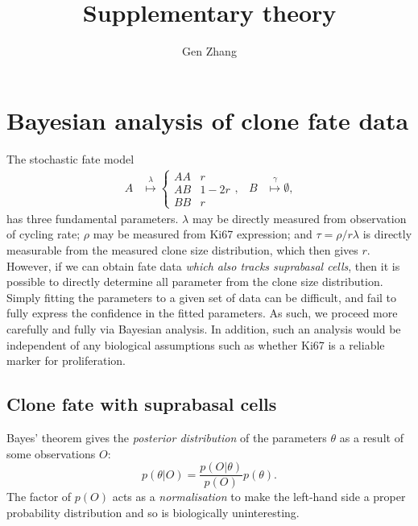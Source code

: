 \documentclass[10pt,UKenglish]{article}
\begin{document}
\title{Supplementary theory}
\author{Gen Zhang}
 
\maketitle

\renewcommand{\thesection}{S\arabic{section}}

\section{Bayesian analysis of clone fate data}

The stochastic fate model 
\begin{align}
A &\overset{\lambda}{\longmapsto} \begin{cases}
AA & r \\
AB & 1-2r \\
BB & r\end{cases}, & B &\overset{\gamma}{\longmapsto} \emptyset,
\label{eq:basal-model}
\end{align}
has three fundamental parameters. $\lambda$ may be directly measured from observation of cycling rate; $\rho$ may be measured from Ki67 expression; and $\tau = \rho/r\lambda$ is directly measurable from the measured clone size distribution, which then gives $r$. However, if we can obtain fate data \emph{which also tracks suprabasal cells}, then it is possible to directly determine all parameter from the clone size distribution. Simply fitting the parameters to a given set of data can be difficult, and fail to fully express the confidence in the fitted parameters. As such, we proceed more carefully and fully via Bayesian analysis. In addition, such an analysis would be independent of any biological assumptions such as whether Ki67 is a reliable marker for proliferation.

\subsection{Clone fate with suprabasal cells}

Bayes' theorem gives the \emph{posterior distribution} of the parameters $\theta$ as a result of some observations $O$: $$p(\theta|O) = \frac{p(O|\theta)}{p(O)} p(\theta).$$ The factor of $p(O)$ acts as a \emph{normalisation} to make the left-hand side a proper probability distribution and so is biologically uninteresting. 
\end{document}
